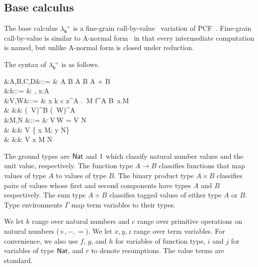 \documentclass[12pt,phd,lfcs,twoside,openright,logo,leftchapter,normalheadings]{infthesis}
\theoremstyle{plain}
\theoremstyle{definition}
\begin{document}
\subsection{Base calculus}
\label{sec:base-calculus}
The base calculus $\lambda^\rightarrow_{\mathsf{b}}$ is a fine-grain
call-by-value~\cite{LevyPT03} variation of PCF~\cite{Plotkin77}.
%
Fine-grain call-by-value is similar to A-normal
form~\cite{FlanaganSDF93} in that every intermediate computation is
named, but unlike A-normal form is closed under reduction.

The syntax of $\lambda^\rightarrow_{\mathsf{b}}$ is as follows.
{\noindent
  \begin{syntax}
              &A,B,C,D\in\TypeCat  &::= & \Nat \mid \One \mid A \to B \mid A \times B \mid A + B \\
     &\Gamma\in\TyEnvCat &::= & \cdot \mid \Gamma, x:A \\
        &V,W\in\ValCat  &::= & x \mid k \mid c \mid \lambda x^A .\, M \mid \Rec \; f^{A \to B}\, x.M \\
                     &               &\mid& \Unit \mid {} \mid (\Inl\, V)^B \mid (\Inr\, W)^A\\
  &M,N\in\CompCat
                           &::= & V\,W
                            \mid  \Let\;  = V \; \In \; N \\
                     &     &\mid&\Case \; V \;\{ \Inl \; x \mapsto M; \Inr \; y \mapsto N\}\\
                     &    &\mid& \Return\; V
                           \mid \Let \; x \revto M \; \In \; N \\
\end{syntax}}%
%
The ground types are $\mathsf{Nat}$ and $1$ which classify natural number
values and the unit value, respectively. The function type $A \to B$
classifies functions that map values of type $A$ to values of type
$B$. The binary product type $A \times B$ classifies pairs of values
whose first and second components have types $A$ and $B$
respectively. The sum type $A + B$ classifies tagged values of either
type $A$ or $B$.
%
Type environments $\Gamma$ map term variables to their types.

We let $k$ range over natural numbers and $c$ range over primitive
operations on natural numbers ($+, -, =$).
%
We let $x, y, z$ range over term variables.
%
For convenience, we also use $f$, $g$, and $h$ for variables of
function type, $i$ and $j$ for variables of type $\mathsf{Nat}$, and $r$ to
denote resumptions.
%
The value terms are standard.
\end{document}
